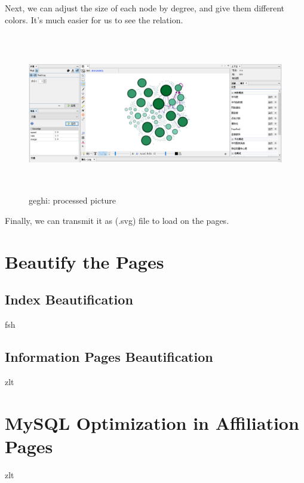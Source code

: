 \documentclass{book}
\begin{document}
Next, we can adjust the  size of each node by degree, and give them different colors.
It's much easier for us to see the relation.
\begin{figure}[H]
\centering
\includegraphics[height=7.0cm,width=18.0cm]{img/yhb_ge_2.png}
\caption{geghi: processed picture}
\end{figure}
Finally, we can transmit it as (.svg) file to load on the pages.

\chapter {Beautify the Pages}

\section {Index Beautification}

fsh

\section {Information Pages Beautification}

zlt


\chapter {MySQL Optimization in Affiliation Pages}

zlt
\end{document}
